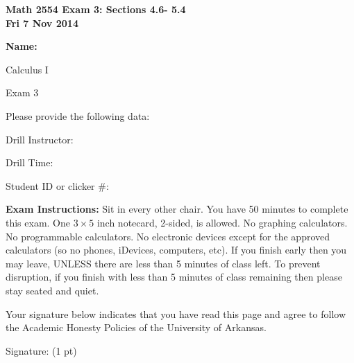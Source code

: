 \documentclass[11pt,letterpaper]{article}
\begin{document}
\flushleft
\begin{multicols}{2}

\begin{large}\textbf{Math 2554 Exam 3: Sections 4.6- 5.4\\
Fri 7 Nov 2014}\end{large}

\hfill\textbf{Name:  }\underline{\hspace{40ex}} %
\\
\vspace{.5in}

\end{multicols}

\pagestyle{empty}

\flushleft

\begin{center}\Large Calculus I 

Exam 3 \end{center}

\vspace{2pc}
Please provide the following data:

\vspace{2pc}
Drill Instructor: \underline{\hspace{40ex}}

\vspace{2pc}
Drill Time: \underline{\hspace{40ex}}

\vspace{2pc}
Student ID or clicker \#: \underline{\hspace{40ex}}

\vspace{3pc}
{\bf Exam Instructions:} Sit in every other chair.  You have 50 minutes to complete this exam.  One $3\times 5$ inch notecard, 2-sided, is allowed.  No graphing calculators.  No programmable calculators.  No electronic devices except for the approved calculators (so no phones, iDevices, computers, etc).  If you finish early then you may leave, UNLESS there are less than 5 minutes of class left.  To prevent disruption, if you finish with less than 5 minutes of class remaining then please stay seated and quiet.

\vspace{5pc}
Your signature below indicates that you have read this page and agree to follow the Academic Honesty Policies of the University of Arkansas.  

\vspace{3pc}
Signature: (1 pt) \underline{\hspace{80ex}}
\end{document}
